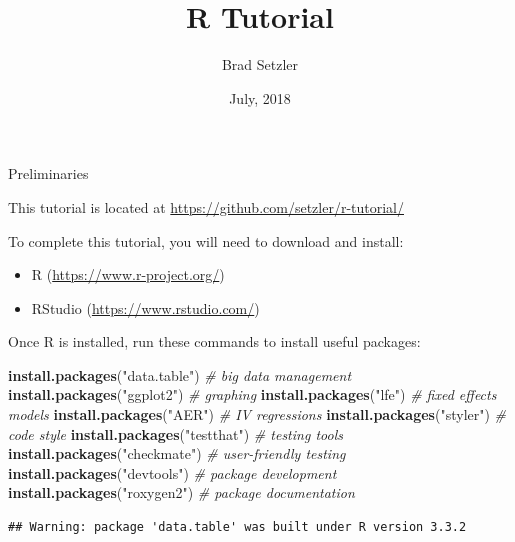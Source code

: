 \documentclass[10pt,ignorenonframetext,]{beamer}
\title{R Tutorial}
\author{Brad Setzler}
\institute{University of Chicago\\
\url{https://github.com/setzler/r-tutorial/}}
\date{July, 2018}
\newenvironment{Shaded}{\begin{snugshade}}{\end{snugshade}}
\newcommand{\KeywordTok}[1]{\textcolor[rgb]{0.13,0.29,0.53}{\textbf{{#1}}}}
\newcommand{\StringTok}[1]{\textcolor[rgb]{0.31,0.60,0.02}{{#1}}}
\newcommand{\CommentTok}[1]{\textcolor[rgb]{0.56,0.35,0.01}{\textit{{#1}}}}
\newcommand{\NormalTok}[1]{{#1}}
\providecommand{\tightlist}{%
\setlength{\itemsep}{0pt}\setlength{\parskip}{0pt}}
\begin{document}
\frame{\titlepage}

\begin{frame}
\tableofcontents[hideallsubsections]
\end{frame}

\begin{frame}

\end{frame}

\begin{frame}[fragile]{Preliminaries}

This tutorial is located at \url{https://github.com/setzler/r-tutorial/}

To complete this tutorial, you will need to download and install:

\begin{itemize}
\tightlist
\item
  R (\url{https://www.r-project.org/})
\item
  RStudio (\url{https://www.rstudio.com/})
\end{itemize}

Once R is installed, run these commands to install useful packages:

\small

\begin{Shaded}
\begin{Highlighting}[]
\KeywordTok{install.packages}\NormalTok{(}\StringTok{"data.table"}\NormalTok{) }\CommentTok{# big data management}
\KeywordTok{install.packages}\NormalTok{(}\StringTok{"ggplot2"}\NormalTok{) }\CommentTok{# graphing}
\KeywordTok{install.packages}\NormalTok{(}\StringTok{"lfe"}\NormalTok{) }\CommentTok{# fixed effects models}
\KeywordTok{install.packages}\NormalTok{(}\StringTok{"AER"}\NormalTok{) }\CommentTok{# IV regressions}
\KeywordTok{install.packages}\NormalTok{(}\StringTok{"styler"}\NormalTok{) }\CommentTok{# code style}
\KeywordTok{install.packages}\NormalTok{(}\StringTok{"testthat"}\NormalTok{) }\CommentTok{# testing tools}
\KeywordTok{install.packages}\NormalTok{(}\StringTok{"checkmate"}\NormalTok{) }\CommentTok{# user-friendly testing}
\KeywordTok{install.packages}\NormalTok{(}\StringTok{"devtools"}\NormalTok{) }\CommentTok{# package development}
\KeywordTok{install.packages}\NormalTok{(}\StringTok{"roxygen2"}\NormalTok{) }\CommentTok{# package documentation}
\end{Highlighting}
\end{Shaded}

\normalsize

\small

\begin{verbatim}
## Warning: package 'data.table' was built under R version 3.3.2
\end{verbatim}

\normalsize

\end{frame}
\end{document}
